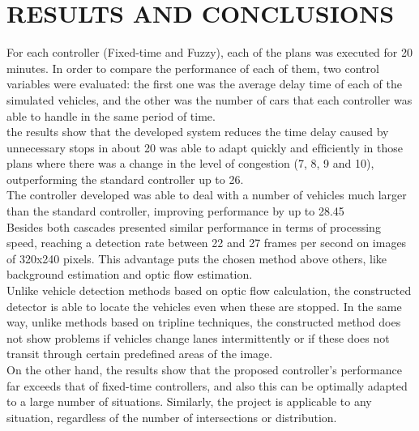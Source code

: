 \documentclass{SureshLimkar}
\begin{document}
\chapter{RESULTS AND CONCLUSIONS}

\hspace {0.5 in} For each controller (Fixed-time and Fuzzy), each of the
plans was executed for 20 minutes. In order to compare the
performance of each of them, two control variables were
evaluated: the ﬁrst one was the average delay time of each of
the simulated vehicles, and the other was the number of cars
that each controller was able to handle in the same period of
time.\\

\hspace {0.5 in} the results show that the developed
system reduces the time delay caused by unnecessary stops in about 20%
was able to adapt quickly and efﬁciently in those plans where
there was a change in the level of congestion (7, 8, 9 and 10),
outperforming the standard controller up to 26. 
\\

\hspace {0.5 in} The controller developed was able to deal with a number of vehicles much
larger than the standard controller, improving performance by
up to 28.45%
\\

\hspace {0.5 in} Besides both cascades presented similar performance in
terms of processing speed, reaching a detection rate between
22 and 27 frames per second on images of 320x240 pixels. This advantage puts the chosen method above
others, like background estimation and optic ﬂow estimation.
\\

\hspace {0.5 in} Unlike vehicle detection methods based on optic ﬂow calculation, the constructed detector is able to locate the vehicles
even when these are stopped. In the same way, unlike methods
based on tripline techniques, the constructed method does not
show problems if vehicles change lanes intermittently or if
these does not transit through certain predeﬁned areas of the
image.
\\

\hspace {0.5 in} On the other hand, the results show that the proposed controller’s performance far exceeds that of ﬁxed-time controllers,
and also this can be optimally adapted to a large number of
situations. Similarly, the project is applicable to any situation,
regardless of the number of intersections or distribution.
\\
\end{document}
